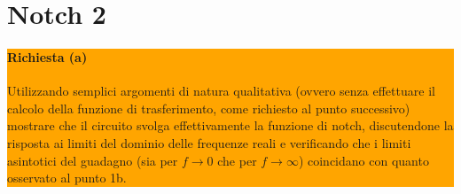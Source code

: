 \section*{Notch 2}
\noindent\colorbox{orange}{
  \begin{minipage}{1.0\linewidth}
    \paragraph{Richiesta (a)}
    Utilizzando semplici argomenti di natura qualitativa (ovvero senza effettuare il calcolo
    della funzione di trasferimento, come richiesto al punto successivo) mostrare che il
    circuito svolga effettivamente la funzione di notch, discutendone la risposta ai limiti del
    dominio delle frequenze reali e verificando che i limiti asintotici del guadagno (sia per
    $f \to 0$ che per $f \to \infty$) coincidano con quanto osservato al punto 1b.
  \end{minipage}
}
